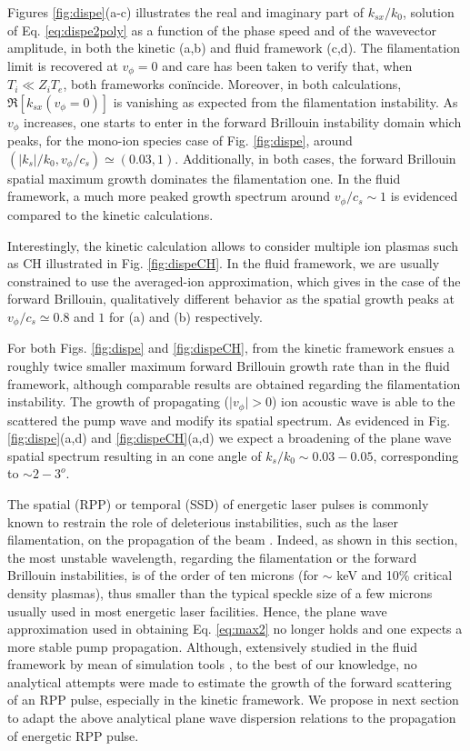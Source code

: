 \documentclass[
 reprint,
 amsmath,amssymb,
 aps,
]{revtex4-1}
\begin{document}
Figures \ref{fig:dispe}(a-c)  illustrates the real and imaginary part of $k_{sx}/k_0$, solution of Eq. \eqref{eq:dispe2poly} as a function of the phase speed and of the wavevector amplitude, in both the kinetic (a,b) and fluid framework (c,d). The filamentation limit is recovered at $v_\phi=0$ and care has been taken to verify that, when $T_i\ll Z_iT_e$, both frameworks con\"incide. Moreover, in both calculations, $\Re[k_{sx}(v_\phi=0)]$ is vanishing as expected from the filamentation instability. As $v_\phi$ increases, one starts to enter in the forward Brillouin instability domain which peaks, for the mono-ion species case of Fig. \ref{fig:dispe}, around $(\vert k_s\vert/k_0, v_\phi/c_s) \simeq(0.03,1)$. Additionally, in both cases, the forward Brillouin spatial maximum  growth dominates the filamentation one. In the fluid framework, a much more peaked growth spectrum around  $ v_\phi/c_s\sim 1 $ is evidenced compared to the kinetic calculations. 

Interestingly, the kinetic calculation allows to consider multiple ion plasmas such as CH  illustrated in Fig. \ref{fig:dispeCH}. In the fluid framework, we are usually constrained to use the averaged-ion approximation, which gives in the case of the forward Brillouin, qualitatively different behavior as the spatial growth peaks at $v_\phi/c_s \simeq 0.8$ and $1$ for (a) and (b) respectively. 

For both Figs. \ref{fig:dispe} and \ref{fig:dispeCH},   from the kinetic framework ensues a  roughly twice smaller maximum forward Brillouin growth rate than in the fluid framework, although comparable results are obtained regarding the filamentation instability. 
The growth of propagating ($\vert v_\phi\vert >0$) ion acoustic wave   is able to the scattered the pump wave and modify its spatial spectrum. As evidenced in Fig. \ref{fig:dispe}(a,d) and \ref{fig:dispeCH}(a,d) we expect a broadening of the plane wave spatial spectrum  resulting in an cone angle of $k_s/k_0\sim 0.03-0.05$, corresponding to $\sim 2-3^o$.  

The spatial (RPP) or temporal (SSD) of energetic laser pulses is commonly known to restrain the role of deleterious instabilities, such as the laser filamentation, on the propagation of the beam \cite[]{}. Indeed, as shown in this section, the most unstable wavelength, regarding the filamentation or the forward Brillouin instabilities, is of the order of ten   microns (for $\sim$ keV and 10\% critical density plasmas), thus smaller than the typical  speckle size   of a few microns   usually used in most energetic laser facilities.  
Hence, the plane wave approximation used in obtaining Eq. \eqref{eq:max2} no longer holds and one expects a more stable pump propagation.
Although, extensively studied in the fluid framework by mean of simulation tools \cite[]{}, to the best of our knowledge, no analytical attempts were made to estimate the growth of the forward scattering of an RPP pulse, especially in the kinetic framework. 
We propose in next section to adapt the above analytical plane wave dispersion relations  to the propagation of energetic RPP pulse.
\end{document}
